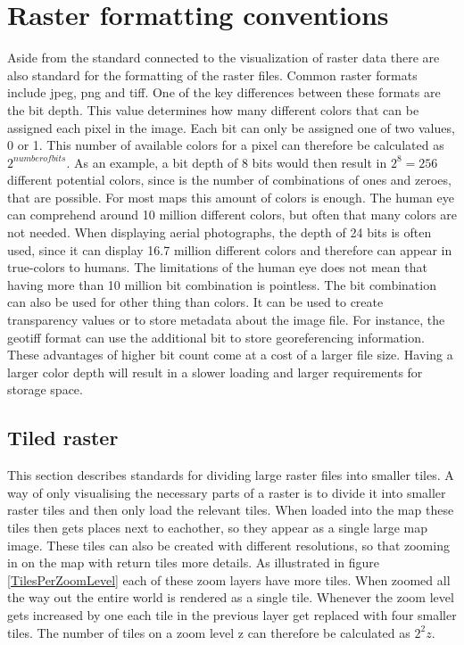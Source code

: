 \section{Raster formatting conventions}

Aside from the standard connected to the visualization of raster data there are also standard for the formatting of the raster files. Common raster formats include jpeg, png and tiff. One of the key differences between these formats are the bit depth. This value determines how many different colors that can be assigned each pixel in the image. Each bit can only be assigned one of two values, 0 or 1. This number of available colors for a pixel can therefore be calculated as $2^{number of bits}$. As an example, a bit depth of 8 bits would then result in $2^8 = 256$ different potential colors, since is the number of combinations of ones and zeroes, that are possible. For most maps this amount of colors is enough. The human eye can comprehend around 10 million different colors, but often that many colors are not needed. When displaying aerial photographs, the depth of 24 bits is often used, since it can display 16.7 million different colors and therefore can appear in true-colors to humans.
The limitations of the human eye does not mean that having more than 10 million bit combination is pointless. The bit combination can also be used for other thing than colors. It can be used to create transparency values or to store metadata about the image file. For instance, the geotiff format can use the additional bit to store georeferencing information.
These advantages of higher bit count come at a cost of a larger file size. Having a larger color depth will result in a slower loading and larger requirements for storage space. \citep{Dent} %

\subsection{Tiled raster}
This section describes standards for dividing large raster files into smaller tiles. 
A way of only visualising the necessary parts of a raster is to divide it into smaller raster tiles and then only load the relevant tiles. When loaded into the map these tiles then gets places next to eachother, so they appear as a single large map image. These tiles can also be created with different resolutions, so that zooming in on the map with return tiles more details.  As illustrated in figure \ref{TilesPerZoomLevel} each of these zoom layers have more tiles.
\citep{Liedman}
When zoomed all the way out the entire world is rendered as a single tile. Whenever the zoom level gets increased by one each tile in the previous layer get replaced with four smaller tiles. The number of tiles on a zoom level z can therefore be calculated as $2^2z$.
\citep{SlippyMap}

